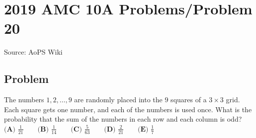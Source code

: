 \documentclass[12pt]{article}
\begin{document}
\section*{{2019 AMC 10A Problems/Problem 20}}
Source: AoPS Wiki

\subsection*{Problem}
The numbers $1,2,\dots,9$ are randomly placed into the $9$ squares of a $3 \times 3$ grid. Each square gets one number, and each of the numbers is used once. What is the probability that the sum of the numbers in each row and each column is odd? $\textbf{(A) }\frac{1}{21}\qquad\textbf{(B) }\frac{1}{14}\qquad\textbf{(C) }\frac{5}{63}\qquad\textbf{(D) }\frac{2}{21}\qquad\textbf{(E) }\frac{1}{7}$
\end{document}
